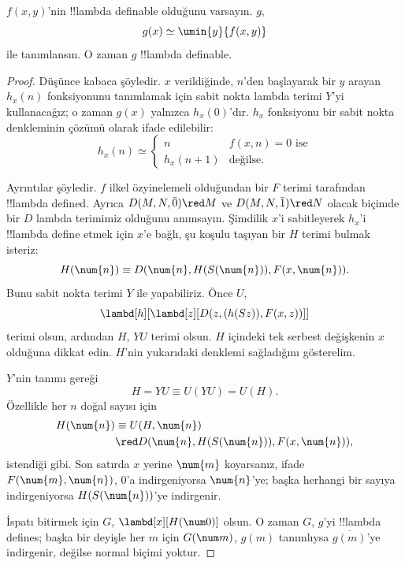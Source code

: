 \documentclass[../../../include/open-logic-section]{subfiles}
\begin{document}

\begin{lem}
$f(x,y)$'nin !!{lambda definable} olduğunu varsayın. $g$,
\[
g(x) \simeq \umin{y}{f(x,y)}
\]
ile tanımlansın. O zaman $g$ !!{lambda definable}.
\end{lem}

\begin{proof}
Düşünce kabaca şöyledir. $x$ verildiğinde, $n$'den başlayarak bir $y$ arayan
$h_x(n)$ fonksiyonunu tanımlamak için sabit nokta lambda terimi $Y$'yi
kullanacağız; o zaman $g(x)$ yalnızca $h_x(0)$'dır. $h_x$ fonksiyonu bir
sabit nokta denkleminin çözümü olarak ifade edilebilir:
\[
h_x(n) \simeq
\begin{cases}
n & \text{$f(x,n) = 0$ ise} \\
h_x(n+1) & \text{değilse.}
\end{cases}
\]

Ayrıntılar şöyledir. $f$ ilkel özyinelemeli olduğundan bir $F$ terimi
tarafından !!{lambda defined}. Ayrıca $D(M,N,\bar{0})\red M$ ve
$D(M,N,\bar{1})\red N$ olacak biçimde bir $D$ lambda terimimiz olduğunu
anımsayın. Şimdilik $x$'i sabitleyerek $h_x$'i !!{lambda define} etmek için
$x$'e bağlı, şu koşulu taşıyan bir $H$ terimi bulmak isteriz:
\[
H(\num{n}) \equiv D(\num{n}, H(S(\num{n})), F(x, \num{n})).
\]
Bunu sabit nokta terimi $Y$ ile yapabiliriz. Önce $U$,
\[
\lambd[h][\lambd[z][D(z,(h(Sz)),F(x,z))]]
\]
terimi olsun, ardından $H$, $YU$ terimi olsun. $H$ içindeki tek serbest
değişkenin $x$ olduğuna dikkat edin. $H$'nin yukarıdaki denklemi sağladığını
gösterelim.

$Y$'nin tanımı gereği
\[
H = YU \equiv U(YU) = U(H).
\]
Özellikle her $n$ doğal sayısı için
\begin{align*}
H(\num{n}) & \equiv U(H, \num{n}) \\
& \red D(\num{n}, H(S(\num{n})), F(x, \num{n})),
\end{align*}
istendiği gibi. Son satırda $x$ yerine $\num{m}$ koyarsanız, ifade
$F(\num{m},\num{n})$, $\num{0}$'a indirgeniyorsa $\num{n}$'ye; başka
herhangi bir sayıya indirgeniyorsa $H(S(\num{n}))$'ye indirgenir.

İspatı bitirmek için $G$, $\lambd[x][H(\num 0)]$ olsun. O zaman $G$, $g$'yi
!!{lambda define}s; başka bir deyişle her $m$ için $G(\num m)$, $g(m)$
tanımlıysa $\overline{g(m)}$'ye indirgenir, değilse normal biçimi yoktur.
\end{proof}
\end{document}
